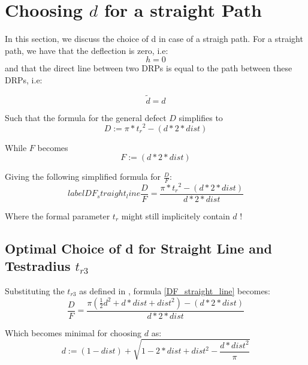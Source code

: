 \section{Choosing $d$ for a straight Path}

In this section, we discuss the choice of d in case of a straigh path.
For a straight path, we have that the deflection is zero, i.e:
\begin{equation}
 \label{straightDeflection}
  h=0
\end{equation}
and that the direct line between two DRPs is equal to the path between these DRPs, i.e:

\begin{equation}
 \label{straightPath}
  \tilde{d}=d
\end{equation}

Such that the formula for the general defect $D$ \label{generalDefectFormula} 
simplifies to
\begin{equation}
 \label{defectStraightPath}
	D:=\pi*{t_r}^2 -(d*2*dist)
\end{equation}

While $F$ becomes
\begin{equation}
  F:=(d*2*dist)
\end{equation}


Giving the following simplified formula for $\frac{D}{F}$:
\begin{equation}
label{DF_straight_line}
	\frac{D}{F}=\frac{\pi*{t_r}^2 -(d*2*dist)}{d*2*dist} 
\end{equation}

Where the formal parameter $t_r$ might still implicitely contain $d$ !


\subsection{Optimal Choice of d for Straight Line and Testradius $t_{r3}$}

Substituting the $t_{r3}$ as defined in  \label{testradius_tr3},
formula \ref{DF_straight_line} becomes:
\begin{equation}
\label{DF_straight_line_tr3}
\frac{D}{F}=\frac{\pi(\frac{1}{2}d^2+d*dist+dist^2) -(d*2*dist)}{d*2*dist}
\end{equation}

Which becomes minimal for choosing $d$ as:
\begin{equation}
\label{optimal_d_straight_line_tr3}
 d:=(1-dist)+\sqrt{1-2*dist+dist^2-\frac{d*dist^2}{\pi}} 
\end{equation}




